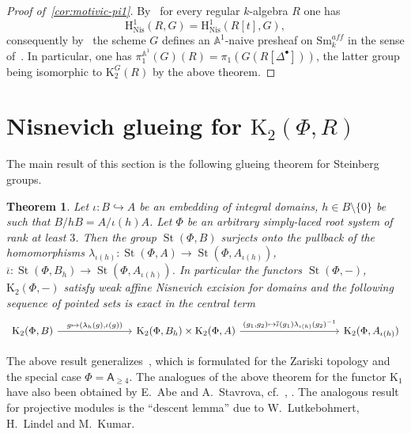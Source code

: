 \documentclass[oneside, 11pt]{amsart} \pdfoutput=1
\newcommand{\K}{{\mathrm{K}}}
\newcommand{\St}{\mathop{\mathrm{St}}\nolimits}
\numberwithin{equation}{section}
\newtheorem{theorem}[lemma]{Theorem}
\theoremstyle{definition}
\newcommand{\rA}{\mathsf{A}}
\begin{document}
\begin{proof}[Proof of~\cref{cor:motivic-pi1}] 
 By~\cite[Corollary~5.4]{Sta20} for every regular $k$-algebra $R$ one has \[\mathrm H^1_\mathrm{Nis}(R, G) = \mathrm H^1_\mathrm{Nis}(R[t], G),\] consequently by~\cite[Theorem~2.4.2]{AHW18} the scheme $G$ defines an $\mathbb{A}^1$-naive presheaf on $\mathrm{Sm}_{k}^{aff}$ in the sense of~\cite[Definition~2.1.1]{AHW18}.
 In particular, one has $\pi_1^{\mathbb{A}^1}(G)(R) = \pi_1(G(R[\Delta^\bullet]))$, the latter group being isomorphic to $\K_2^G(R)$ by the above theorem.
\end{proof}

\section{Nisnevich glueing for \texorpdfstring{$\K_2(\Phi, R)$}{K2(Ф,R)}} \label{sec:patching}
The main result of this section is the following glueing theorem for Steinberg groups.
\begin{theorem}\label{glueing}
Let $\iota\colon B \hookrightarrow A$ be an embedding of integral domains, $h\in B \setminus \{0\}$ be such that $B / hB = A / \iota(h)A$. Let $\Phi$ be an arbitrary simply-laced root system of rank at least $3$.
Then the group $\St(\Phi, B)$ surjects onto the pullback of the homomorphisms 
$\lambda_{\iota(h)}\colon \St(\Phi, A) \to \St(\Phi, A_{\iota(h)})$, $\overline{\iota}\colon\St(\Phi, B_h) \to \St(\Phi, A_{\iota(h)})$. In particular the functors $\St(\Phi, -)$, $\K_2(\Phi, -)$ satisfy weak affine Nisnevich excision for domains and the following sequence of pointed sets is exact in the central term
\begin{equation} \begin{tikzcd} \K_2(\Phi, B) \ar{rrr}{g \mapsto (\lambda_h(g), \iota(g))} & &  & \K_2(\Phi, B_h) \times \K_2(\Phi, A) \ar{rrrr}{(g_1,g_2) \mapsto \overline{\iota}(g_1) \lambda_{\iota(h)}(g_2)^{-1}} & & & & \K_2(\Phi, A_{\iota(h)}) \end{tikzcd} \end{equation}
\end{theorem}
The above result generalizes~\cite[Proposition~1.4]{Tu83}, which is formulated for the Zariski topology and the special case $\Phi=\rA_{\geq 4}$.
The analogues of the above theorem for the functor $\K_1$ have also been obtained by E.~Abe and A.~Stavrova, cf.~\cite[Lemma~3.7]{Abe83}, \cite[Lemma~3.4]{Sta14}.
The analogous result for projective modules is the ``descent lemma'' \cite[Lemma~4.7]{Bh99} due to W.~Lutkebohmert, H.~Lindel and M.~Kumar. 
\end{document}
